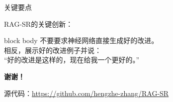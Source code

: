 \documentclass[aspectratio=1610]{beamer}
\begin{document}
    \begin{frame}{关键要点}
        \begin{center}
            \Large
            \alert{RAG-SR的关键创新：}

            \vspace{0.5cm}

            \begin{beamercolorbox}[rounded=true,shadow=true,sep=1em]{block body}
                不要要求神经网络直接生成好的改进。\\
                \vspace{0.3cm}
                相反，展示好的改进例子并说：\\
                ``好的改进是这样的，现在给我一个更好的。''
            \end{beamercolorbox}
        \end{center}
    \end{frame}

    \begin{frame}{}
        \begin{center}
            \Large{\textbf{谢谢！}}

            \vspace{1cm}

            \normalsize
            源代码：\url{https://github.com/hengzhe-zhang/RAG-SR}
        \end{center}
    \end{frame}
\end{document}

